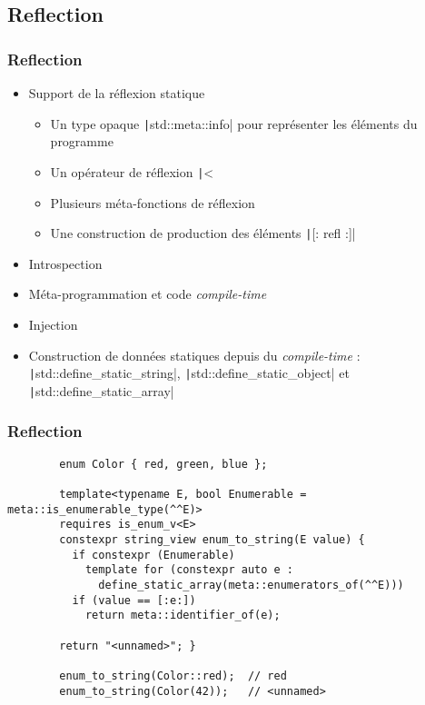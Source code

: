 \documentclass[C++.tex]{subfiles}
\begin{document}
\subsection*{Reflection}
\begin{frame}[fragile]
	\frametitle{Reflection}
	\begin{itemize}
		\item Support de la réflexion statique
		\begin{itemize}
			\item Un type opaque \texttt|std::meta::info| pour représenter les éléments du programme
			\item Un opérateur de réflexion \texttt|^^|
			\item Plusieurs méta-fonctions de réflexion
			\item Une construction de production des éléments \texttt|[: refl :]|
		\end{itemize}
		\item Introspection
		\item Méta-programmation et code \textit{compile-time}
		\item Injection
		\item Construction de données statiques depuis du \textit{compile-time} : \texttt|std::define_static_string|, \texttt|std::define_static_object| et \texttt|std::define_static_array|
	\end{itemize}

\end{frame}

\begin{frame}[fragile]
	\frametitle{Reflection}
	\begin{verbatim}
		enum Color { red, green, blue };

		template<typename E, bool Enumerable = meta::is_enumerable_type(^^E)>
		requires is_enum_v<E>
		constexpr string_view enum_to_string(E value) {
		  if constexpr (Enumerable)
		    template for (constexpr auto e :
		      define_static_array(meta::enumerators_of(^^E)))
		  if (value == [:e:])
		    return meta::identifier_of(e);

		return "<unnamed>"; }

		enum_to_string(Color::red);  // red
		enum_to_string(Color(42));   // <unnamed>
	\end{verbatim}
\end{frame}
\end{document}
